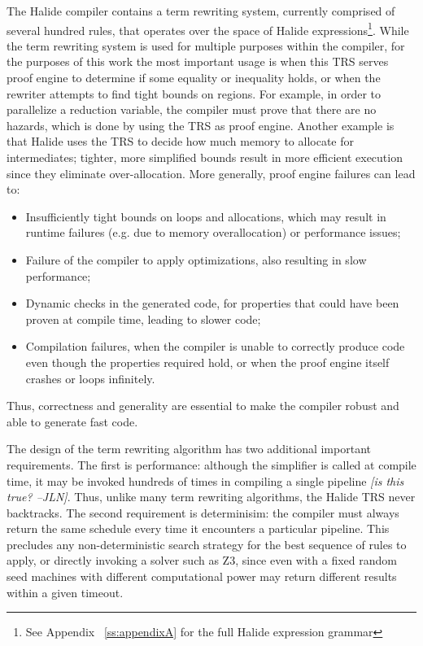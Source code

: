 \documentclass[sigplan,review,anonymous]{acmart}\settopmatter{printfolios=true,printccs=false,printacmref=false}
\newcommand{\jln}[1]{\textcolor{uwpurple}{\textit{[{#1} --JLN]}}}
\begin{document}
The Halide compiler contains a term rewriting system, currently comprised of
several hundred rules, that operates over the space of Halide
expressions\footnote{See Appendix ~\ref{ss:appendixA} for the full Halide
  expression grammar}. While the term rewriting system is used for multiple
purposes within the compiler, for the purposes of this work the most important
usage is when this TRS serves proof engine to determine if
some equality or inequality holds, or when the rewriter attempts to find tight
bounds on regions. For example, in order to parallelize a
reduction variable, the compiler must prove that there are no hazards, which is
done by using the TRS as proof engine.  Another example is that Halide uses
the TRS to decide how much memory to allocate for intermediates; tighter, more
simplified bounds result in more efficient execution since they eliminate over-allocation.
More generally, proof engine failures can lead to:
\begin{itemize}
\item Insufficiently tight bounds on loops and allocations, which may result in
  runtime failures (e.g. due to memory overallocation) or performance issues;

\item Failure of the compiler to apply optimizations, also resulting in slow performance;

\item Dynamic checks in the generated code, for properties that could have been proven
  at compile time, leading to slower code;

\item Compilation failures, when the compiler is unable to correctly produce code
  even though the properties required hold, or when the proof engine itself crashes
  or loops infinitely.
\end{itemize}
Thus, correctness and generality are essential to make the compiler robust and
able to generate fast code.


The design of the term rewriting algorithm has two additional important
requirements. The first is performance: although the simplifier is called at
compile time, it may be invoked hundreds of times in compiling a single pipeline
\jln{is this true?}. Thus, unlike many term rewriting algorithms, the Halide TRS
never backtracks. The second requirement is determinisim: the compiler must
always return the same schedule every time it encounters a particular pipeline.
This precludes any non-deterministic search strategy for the best sequence of
rules to apply, or directly invoking a solver such as Z3, since even with a
fixed random seed machines with different computational power may return
different results within a given timeout.
\end{document}
